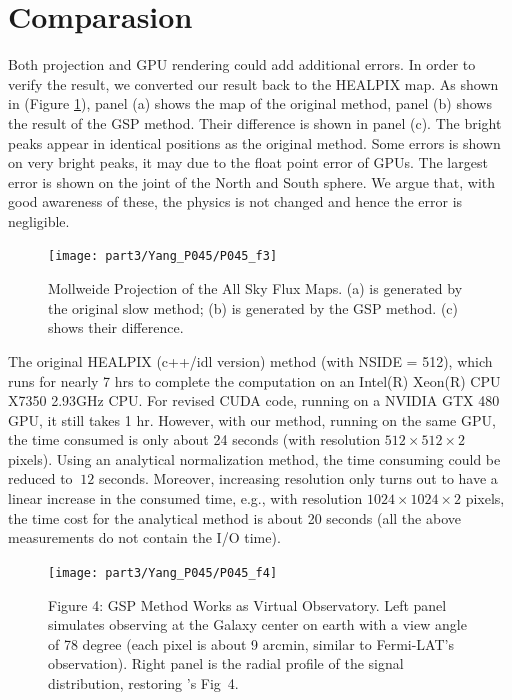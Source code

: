 \section{Comparasion}
Both projection and GPU rendering could add additional errors. In order to verify the result, we converted our result back to the HEALPIX map. As shown in (Figure \ref{figcmp}), panel (a) shows the map of the original method, panel (b) shows the result of the GSP method. Their difference is shown in panel (c). The bright peaks appear in identical positions as the original method. Some errors is shown on very bright peaks, it may due to the float point error of GPUs. The largest error is shown on the joint of the North and South sphere. We argue that, with good awareness of these, the physics is not changed and hence the error is negligible. 

\begin{figure}[htb]
\begin{center}
 \texttt{[image: part3/Yang\_P045/P045\_f3]}
\caption{Mollweide Projection of the All Sky Flux Maps. (a) is generated by the original slow method; (b) is generated by the GSP method. (c) shows their difference. \label{figcmp}}
\end{center}
\end{figure}

The original HEALPIX (c++/idl version) method (with NSIDE = 512), which runs for nearly 7 hrs to complete the computation on an Intel(R) Xeon(R) CPU X7350 2.93GHz CPU. For revised CUDA code, running on a NVIDIA GTX 480 GPU, it still takes 1 hr. However, with our method, running on the same GPU, the time consumed is only about 24 seconds (with resolution $512\times512\times2$ pixels). Using an analytical normalization method, the time consuming could be reduced to $~12$ seconds. Moreover, increasing resolution only turns out to have a linear increase in the consumed time, e.g., with resolution $1024\times1024\times2$ pixels, the time cost for the analytical method is about 20 seconds (all the above measurements do not contain the I/O time). 

\begin{figure}[htb]
\begin{center}
 \texttt{[image: part3/Yang\_P045/P045\_f4]}
\caption{Figure 4: GSP Method Works as Virtual Observatory. Left panel simulates observing at the Galaxy center on earth with a view angle of 78 degree (each pixel is about 9 arcmin, similar to Fermi-LAT’s observation). Right panel is the radial profile of the signal distribution, restoring \citet{Kuhlen:2008kr}'s Fig~4.  \label{figapp}}
\end{center}
\end{figure}

